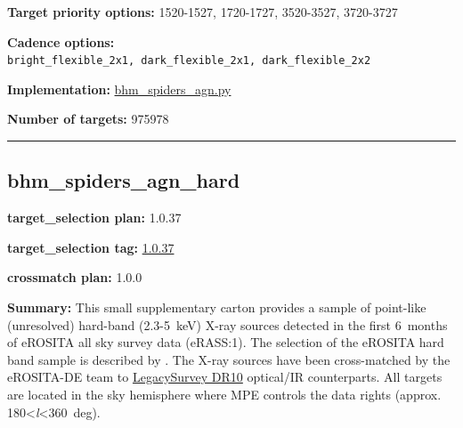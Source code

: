 \noindent\textbf{Target priority options:} 1520-1527, 1720-1727, 3520-3527,
3720-3727

\noindent\textbf{Cadence options:}
\texttt{bright\_flexible\_2x1,\ dark\_flexible\_2x1,\ dark\_flexible\_2x2}

\noindent\textbf{Implementation:}
\href{https://github.com/sdss/target_selection/blob/1.0.37/python/target_selection/cartons/bhm_spiders_agn.py}{bhm\_spiders\_agn.py}

\noindent\textbf{Number of targets:} 975978

\begin{center}\rule{0.5\linewidth}{0.5pt}\end{center}

\hypertarget{bhm_spiders_agn_hard_plan1.0.37}{%
\subsection{bhm\_spiders\_agn\_hard}\label{bhm_spiders_agn_hard_plan1.0.37}}

\noindent\textbf{target\_selection plan:} 1.0.37

\noindent\textbf{target\_selection tag:}
\href{https://github.com/sdss/target_selection/tree/1.0.37/}{1.0.37}

\noindent\textbf{crossmatch plan:} 1.0.0

\noindent\textbf{Summary:} This small supplementary carton provides a sample of
point-like (unresolved) hard-band (2.3-5~keV) X-ray sources detected in
the first 6~months of eROSITA all sky survey data (eRASS:1). The
selection of the eROSITA hard band sample is described by
\citealt{Waddell2026}. The X-ray sources have been cross-matched by the
eROSITA-DE team to
\href{https://www.legacysurvey.org/dr10/}{LegacySurvey DR10} optical/IR
counterparts. All targets are located in the sky hemisphere where MPE
controls the data rights (approx.
180\textless{}\emph{l}\textless360~deg).

